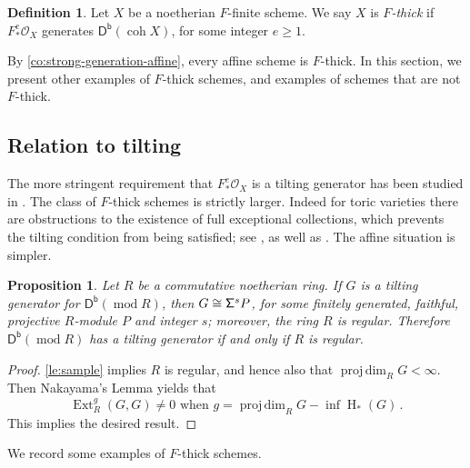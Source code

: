 \documentclass{amsart}
\newcommand{\coh}{\operatorname{coh}}
\newcommand{\dbcat}[1]{\cat{D}^{\mathsf{b}}(#1)}
\newcommand{\mco}{\mathcal{O}}
\newcommand{\cat}[1]{{\mathsf{#1}}}
\newcommand{\Ext}{\operatorname{Ext}}
\newcommand{\hh}{\operatorname{H}}
\newcommand{\rmod}{\operatorname{mod}}
\newcommand{\pdim}{\operatorname{proj\,dim}}
\newcommand{\shift}{{\sf\Sigma}}
\newtheorem{proposition}[subsection]{Proposition}
\theoremstyle{definition}
\newtheorem{definition}[subsection]{Definition}
\theoremstyle{remark}
\numberwithin{equation}{subsection}
\begin{document}
\begin{definition}
\label{def:F_thick}
Let $X$ be a noetherian $F$-finite scheme. We say $X$ is \emph{$F$-thick} if $F_*^e \mco_X$ generates $\dbcat{\coh{X}}$, for some integer $e\ge 1$.
\end{definition}

By \cref{co:strong-generation-affine}, every affine scheme is $F$-thick. In this section, we present other examples of $F$-thick schemes, and examples of schemes that are not $F$-thick.

\subsection*{Relation to tilting}
The more stringent requirement that $F_*^e \mco_X$ is a tilting generator has been studied in \cite{Langer:2008, Raedschelders/Spenko/VandenBergh:2019,tilting_frob, frob_flag_1}. The class of $F$-thick schemes is strictly larger. Indeed for toric varieties there are obstructions to the existence of full exceptional collections, which prevents the tilting condition from being satisfied; see \cite[Theorem 1.3]{Efimov:2014}, as well as \cite{PerlingHille:2006,Mateusz:2011}. The affine situation is simpler.
 
\begin{proposition}\label{pr:regularity_via_tilting}
Let $R$ be a commutative noetherian ring. If $G$ is a tilting generator for $\dbcat{\rmod R}$, then $G\cong \shift^s P$, for some finitely generated, faithful, projective $R$-module $P$ and integer $s$; moreover, the ring $R$ is regular. Therefore $\dbcat{\rmod R}$ has a tilting generator if and only if $R$ is regular.
\end{proposition}

\begin{proof}
\cref{le:sample} implies $R$ is regular, and hence also that $\pdim_RG<\infty$. Then Nakayama's Lemma yields that
\[
\Ext_R^g(G,G) \ne 0 \text{ when } g=\pdim_RG - \inf \hh_*(G)\,.
\]
This implies the desired result.
\end{proof}

We record some examples of $F$-thick schemes.
\end{document}
